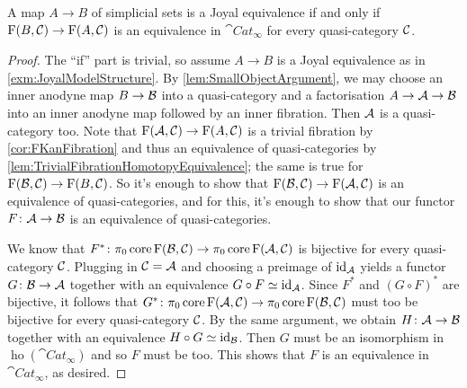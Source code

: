 \begin{lem}\label{lem:JoyalEquivalence}
	A map $A\rightarrow B$ of simplicial sets is a Joyal equivalence if and only if $\operatorname{F}(B,\mathcal{C})\rightarrow\operatorname{F}(A,\mathcal{C})$ is an equivalence in $\cat{Cat}_\infty$ for every quasi-category $\mathcal{C}$.
\end{lem}
\begin{proof}
	The \enquote{if} part is trivial, so assume $A\rightarrow B$ is a Joyal equivalence as in \cref{exm:JoyalModelStructure}.  By \cref{lem:SmallObjectArgument}, we may choose an inner anodyne map $B\rightarrow\mathcal{B}$ into a quasi-category and a factorisation $A\rightarrow\mathcal{A}\rightarrow\mathcal{B}$ into an inner anodyne map followed by an inner fibration. Then $\mathcal{A}$ is a quasi-category too. Note that $\operatorname{F}(\mathcal{A},\mathcal{C})\rightarrow \operatorname{F}(A,\mathcal{C})$ is a trivial fibration by \cref{cor:FKanFibration} and thus an equivalence of quasi-categories by \cref{lem:TrivialFibrationHomotopyEquivalence}; the same is true for $\operatorname{F}(\mathcal{B},\mathcal{C})\rightarrow \operatorname{F}(B,\mathcal{C})$. So it's enough to show that $\operatorname{F}(\mathcal{B},\mathcal{C})\rightarrow\operatorname{F}(\mathcal{A},\mathcal{C})$ is an equivalence of quasi-categories, and for this, it's enough to show that our functor $F\colon \mathcal{A}\rightarrow\mathcal{B}$ is an equivalence of quasi-categories.
	
	We know that $F^*\colon \pi_0\operatorname{core}\operatorname{F}(\mathcal{B},\mathcal{C})\rightarrow\pi_0\operatorname{core}\operatorname{F}(\mathcal{A},\mathcal{C})$ is bijective for every quasi-category $\mathcal{C}$. Plugging in $\mathcal{C}=\mathcal{A}$ and choosing a preimage of $\operatorname{id}_{\mathcal{A}}$ yields a functor $G\colon \mathcal{B}\rightarrow\mathcal{A}$ together with an equivalence $G\circ F\simeq \operatorname{id}_{\mathcal{A}}$. Since $F^*$ and $(G\circ F)^*$ are bijective, it follows that $G^*\colon \pi_0\operatorname{core}\operatorname{F}(\mathcal{A},\mathcal{C})\rightarrow\pi_0\operatorname{core}\operatorname{F}(\mathcal{B},\mathcal{C})$ must too be bijective for every quasi-category $\mathcal{C}$. By the same argument, we obtain $H\colon \mathcal{A}\rightarrow \mathcal{B}$ together with an equivalence $H\circ G\simeq \operatorname{id}_{\mathcal{B}}$. Then $G$ must be an isomorphism in $\operatorname{ho}(\cat{Cat}_\infty)$ and so $F$ must be too. This shows that $F$ is an equivalence in $\cat{Cat}_\infty$, as desired.
\end{proof}
